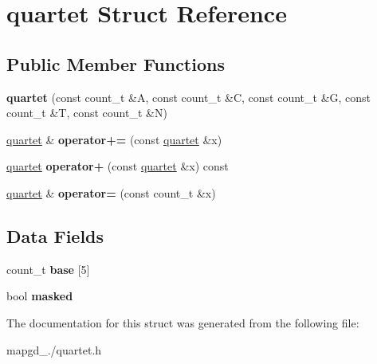 \hypertarget{structquartet}{\section{quartet Struct Reference}
\label{structquartet}
}
\subsection*{Public Member Functions}
\begin{DoxyCompactItemize}
\item 
\hypertarget{structquartet_a4e62827f68d59ffaa81ec61ddc979596}{{\bfseries quartet} (const count\-\_\-t \&A, const count\-\_\-t \&C, const count\-\_\-t \&G, const count\-\_\-t \&T, const count\-\_\-t \&N)}\label{structquartet_a4e62827f68d59ffaa81ec61ddc979596}

\item 
\hypertarget{structquartet_a6b1bb41bb1851aadb3647afa62bb34ed}{\hyperlink{structquartet}{quartet} \& {\bfseries operator+=} (const \hyperlink{structquartet}{quartet} \&x)}\label{structquartet_a6b1bb41bb1851aadb3647afa62bb34ed}

\item 
\hypertarget{structquartet_af45359481a51a08241411e9aafdbccc5}{\hyperlink{structquartet}{quartet} {\bfseries operator+} (const \hyperlink{structquartet}{quartet} \&x) const }\label{structquartet_af45359481a51a08241411e9aafdbccc5}

\item 
\hypertarget{structquartet_a028bb3904f94f555cb6349b227da6798}{\hyperlink{structquartet}{quartet} \& {\bfseries operator=} (const count\-\_\-t \&x)}\label{structquartet_a028bb3904f94f555cb6349b227da6798}

\end{DoxyCompactItemize}
\subsection*{Data Fields}
\begin{DoxyCompactItemize}
\item 
\hypertarget{structquartet_ab6231b6ff3dbe82a46c6411c9a56f12e}{count\-\_\-t {\bfseries base} \mbox{[}5\mbox{]}}\label{structquartet_ab6231b6ff3dbe82a46c6411c9a56f12e}

\item 
\hypertarget{structquartet_ab55b5c0ef78a0dabebdc7bec6a1bd053}{bool {\bfseries masked}}\label{structquartet_ab55b5c0ef78a0dabebdc7bec6a1bd053}

\end{DoxyCompactItemize}


The documentation for this struct was generated from the following file\-:\begin{DoxyCompactItemize}
\item 
mapgd\-\_./quartet.\-h\end{DoxyCompactItemize}
